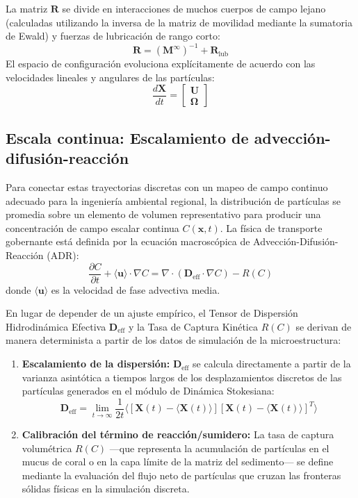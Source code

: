 La matriz $\bm{R}$ se divide en interacciones de muchos cuerpos de campo lejano (calculadas utilizando la inversa de la matriz de movilidad mediante la sumatoria de Ewald) y fuerzas de lubricación de rango corto:
\begin{equation}
    \bm{R} = (\bm{M}^{\infty})^{-1} + \bm{R}_{\text{lub}}
\end{equation}
El espacio de configuración evoluciona explícitamente de acuerdo con las velocidades lineales y angulares de las partículas:
\begin{equation}
    \frac{d\bm{X}}{dt} = \begin{bmatrix} \bm{U} \\ \bm{\Omega} \end{bmatrix}
\end{equation}

\subsection{Escala continua: Escalamiento de advección-difusión-reacción}
Para conectar estas trayectorias discretas con un mapeo de campo continuo adecuado para la ingeniería ambiental regional, la distribución de partículas se promedia sobre un elemento de volumen representativo para producir una concentración de campo escalar continua $C(\bm{x}, t)$. La física de transporte gobernante está definida por la ecuación macroscópica de Advección-Difusión-Reacción (ADR):
\begin{equation}
    \frac{\partial C}{\partial t} + \bm{\langle u \rangle} \cdot \nabla C = \nabla \cdot \left( \bm{D}_{\text{eff}} \cdot \nabla C \right) - R(C)
\end{equation}
donde $\bm{\langle u \rangle}$ es la velocidad de fase advectiva media. 

En lugar de depender de un ajuste empírico, el Tensor de Dispersión Hidrodinámica Efectiva $\bm{D}_{\text{eff}}$ y la Tasa de Captura Kinética $R(C)$ se derivan de manera determinista a partir de los datos de simulación de la microestructura:
\begin{enumerate}
    \item \textbf{Escalamiento de la dispersión:} $\bm{D}_{\text{eff}}$ se calcula directamente a partir de la varianza asintótica a tiempos largos de los desplazamientos discretos de las partículas generados en el módulo de Dinámica Stokesiana:
    \begin{equation}
        \bm{D}_{\text{eff}} = \lim_{t \to \infty} \frac{1}{2t} \langle [\bm{X}(t) - \langle \bm{X}(t) \rangle][\bm{X}(t) - \langle \bm{X}(t) \rangle]^T \rangle
    \end{equation}
    \item \textbf{Calibración del término de reacción/sumidero:} La tasa de captura volumétrica $R(C)$ ---que representa la acumulación de partículas en el mucus de coral o en la capa límite de la matriz del sedimento--- se define mediante la evaluación del flujo neto de partículas que cruzan las fronteras sólidas físicas en la simulación discreta.
\end{enumerate}


